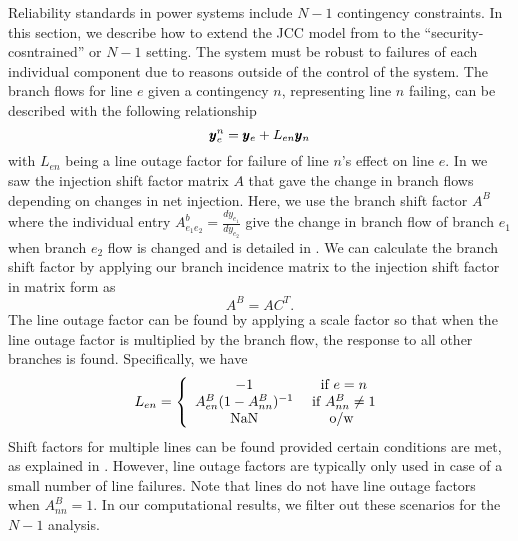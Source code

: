 Reliability standards in power systems include $N-1$ contingency constraints.  In this section, we describe how to extend the JCC model from  to the ``security-cosntrained'' or $N-1$ setting. The system must be robust to failures of each individual component due to reasons outside of the control of the system. The branch flows for line $e$ given a contingency $n$, representing line $n$ failing, can be described with the following relationship
\begin{equation}\label{n1cont}
 \pmb{y}_e^n = \pmb{y}_e + L_{e n} \pmb{y}_n 
\end{equation}
with $L_{en}$ being a line outage factor for failure of line $n$'s effect on line $e$.  In  we saw the injection shift factor matrix $A$ that gave the change in branch flows depending on changes in net injection.  Here, we use the branch shift factor $A^B$ where the individual entry $A_{e_1 e_2}^b = \frac{ dy_{e_1}}{dy_{e_2}}$ give the change in branch flow of branch $e_1$ when branch $e_2$ flow is changed and is detailed in \cite{matpower}.  We can calculate the branch shift factor by applying our branch incidence matrix to the injection shift factor in matrix form as 
\begin{equation}
A^B = A C^T.
\end{equation}
The line outage factor can be found by applying a scale factor so that when the line outage factor is multiplied by the branch flow, the response to all other branches is found.  Specifically, we have  
\begin{equation}\label{line_outage}
L_{en} = \left\{ \begin{array}{c c}
  -1 & \mbox{ if } e=n\\
  A_{en}^B (1-A_{nn}^B)^{-1} & \mbox{ if } A_{nn}^B \neq 1\\
  \mbox{NaN} & \mbox{ o/w }
  \end{array}
\right.
\end{equation}
Shift factors for multiple lines can be found provided certain conditions are met, as explained in \cite{guler_2007}.  However, line outage factors are typically only used in case of a small number of line failures.  Note that lines do not have line outage factors when $A_{nn}^B = 1$.  In our computational results, we filter out these scenarios for the $N-1$ analysis.



